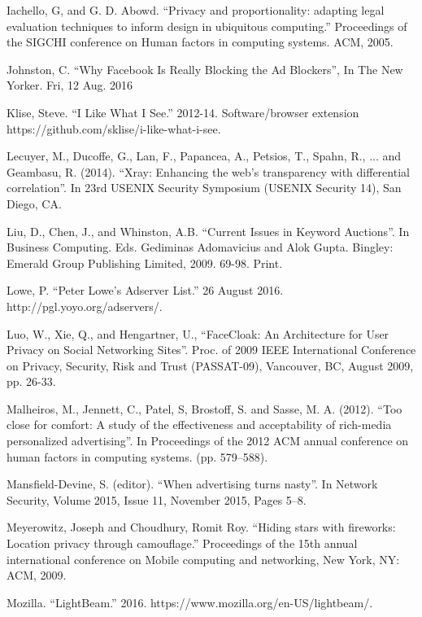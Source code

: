 \documentclass[conference]{IEEEtran}
\begin{document}
\begin{thebibliography}{99}
 Iachello, G, and G. D. Abowd. ``Privacy and proportionality: adapting legal evaluation techniques to inform design in ubiquitous computing.'' Proceedings of the SIGCHI conference on Human factors in computing systems. ACM, 2005.

 Johnston, C. ``Why Facebook Is Really Blocking the Ad Blockers'', In The New Yorker. Fri, 12 Aug. 2016

 Klise, Steve. ``I Like What I See.'' 2012-14. Software/browser extension https://github.com/sklise/i-like-what-i-see.

 Lecuyer, M., Ducoffe, G., Lan, F., Papancea, A., Petsios, T., Spahn, R., ... and Geambasu, R. (2014). ``Xray: Enhancing the web's transparency with differential correlation''. In 23rd USENIX Security Symposium (USENIX Security 14), San Diego, CA.

 Liu, D., Chen, J., and Whinston, A.B. ``Current Issues in Keyword Auctions''. In Business Computing. Eds. Gediminas Adomavicius and Alok Gupta. Bingley: Emerald Group Publishing Limited, 2009. 69-98. Print.

 Lowe, P. ``Peter Lowe's Adserver List.'' 26 August 2016. http://pgl.yoyo.org/adservers/.

 Luo, W., Xie, Q., and Hengartner, U., ``FaceCloak: An Architecture for User Privacy on Social Networking Sites''. Proc. of 2009 IEEE International Conference on Privacy, Security, Risk and Trust (PASSAT-09), Vancouver, BC, August 2009, pp. 26-33.

 Malheiros, M., Jennett, C., Patel, S, Brostoff, S. and Sasse, M. A. (2012). ``Too close for comfort: A study of the effectiveness and acceptability of rich-media personalized advertising''. In Proceedings of the 2012 ACM annual conference on human factors in computing systems. (pp. 579–588).

 Mansfield-Devine, S. (editor). ``When advertising turns nasty''. In Network Security, Volume 2015, Issue 11, November 2015, Pages 5–8.

 Meyerowitz, Joseph and Choudhury, Romit Roy. ``Hiding stars with fireworks: Location privacy through camouflage.'' Proceedings of the 15th annual international conference on Mobile computing and networking, New York, NY: ACM, 2009.

 Mozilla. ``LightBeam.'' 2016. https://www.mozilla.org/en-US/lightbeam/.


\end{thebibliography}
\end{document}
